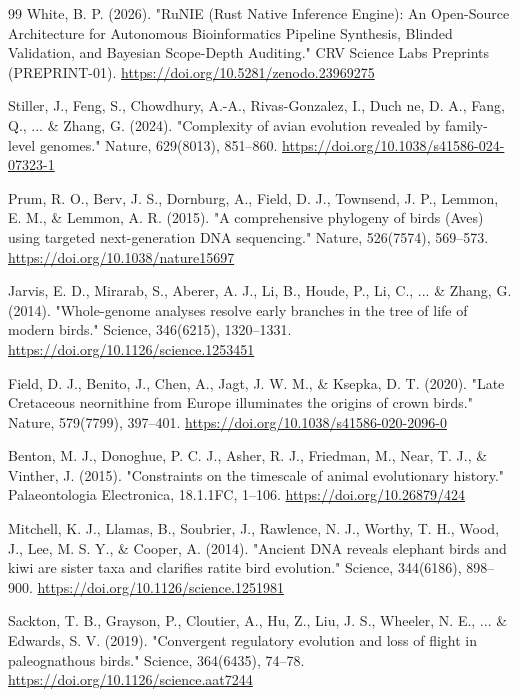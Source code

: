 \documentclass[10pt,letterpaper]{article}
\begin{document}
\begin{thebibliography}{99}
 White, B. P. (2026). "RuNIE (Rust Native Inference Engine): An Open-Source Architecture for Autonomous Bioinformatics Pipeline Synthesis, Blinded Validation, and Bayesian Scope-Depth Auditing." CRV Science Labs Preprints (PREPRINT-01). \url{https://doi.org/10.5281/zenodo.23969275}

 Stiller, J., Feng, S., Chowdhury, A.-A., Rivas-Gonzalez, I., Duch ne, D. A., Fang, Q., ... \& Zhang, G. (2024). "Complexity of avian evolution revealed by family-level genomes." Nature, 629(8013), 851--860. \url{https://doi.org/10.1038/s41586-024-07323-1}

 Prum, R. O., Berv, J. S., Dornburg, A., Field, D. J., Townsend, J. P., Lemmon, E. M., \& Lemmon, A. R. (2015). "A comprehensive phylogeny of birds (Aves) using targeted next-generation DNA sequencing." Nature, 526(7574), 569--573. \url{https://doi.org/10.1038/nature15697}

 Jarvis, E. D., Mirarab, S., Aberer, A. J., Li, B., Houde, P., Li, C., ... \& Zhang, G. (2014). "Whole-genome analyses resolve early branches in the tree of life of modern birds." Science, 346(6215), 1320--1331. \url{https://doi.org/10.1126/science.1253451}

 Field, D. J., Benito, J., Chen, A., Jagt, J. W. M., \& Ksepka, D. T. (2020). "Late Cretaceous neornithine from Europe illuminates the origins of crown birds." Nature, 579(7799), 397--401. \url{https://doi.org/10.1038/s41586-020-2096-0}

 Benton, M. J., Donoghue, P. C. J., Asher, R. J., Friedman, M., Near, T. J., \& Vinther, J. (2015). "Constraints on the timescale of animal evolutionary history." Palaeontologia Electronica, 18.1.1FC, 1--106. \url{https://doi.org/10.26879/424}

 Mitchell, K. J., Llamas, B., Soubrier, J., Rawlence, N. J., Worthy, T. H., Wood, J., Lee, M. S. Y., \& Cooper, A. (2014). "Ancient DNA reveals elephant birds and kiwi are sister taxa and clarifies ratite bird evolution." Science, 344(6186), 898--900. \url{https://doi.org/10.1126/science.1251981}

 Sackton, T. B., Grayson, P., Cloutier, A., Hu, Z., Liu, J. S., Wheeler, N. E., ... \& Edwards, S. V. (2019). "Convergent regulatory evolution and loss of flight in paleognathous birds." Science, 364(6435), 74--78. \url{https://doi.org/10.1126/science.aat7244}


\end{thebibliography}
\end{document}
